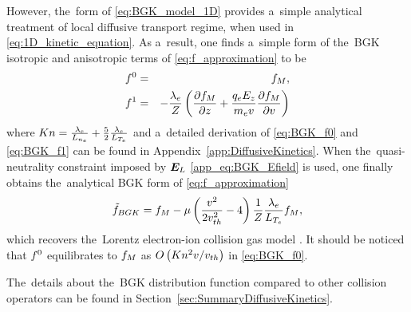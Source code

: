 However, the~form of \eqref{eq:BGK_model_1D} provides a~simple analytical 
treatment of local diffusive transport regime, when used in 
\eqref{eq:1D_kinetic_equation}. As a~result, one finds a~simple form of
the~BGK isotropic and anisotropic terms of \eqref{eq:f_approximation} to be
\begin{eqnarray}
  f^0 &=& f_M ,
  \label{eq:BGK_f0} \\
  f^1 &=& - \frac{\lambda_e}{Z}
  \left( \frac{\partial{f_M}}{\partial{z}} + \frac{q_eE_z}{m_ev}\frac{\partial{f_M}}{\partial{v}} \right)
  \label{eq:BGK_f1}
\end{eqnarray}
where 
$Kn = \frac{\lambda_e}{L_{n_e}} + \frac{5}{2}\frac{\lambda_e}{L_{T_e}}$
and a~detailed derivation of \eqref{eq:BGK_f0} and \eqref{eq:BGK_f1} 
can be found in Appendix~\ref{app:DiffusiveKinetics}.
When the~quasi-neutrality constraint imposed by $\boldsymbol{E}_L$
\eqref{app_eq:BGK_Efield} is used, one finally obtains the~analytical BGK form 
of \eqref{eq:f_approximation}
\begin{equation}
  \tilde{f}_{BGK} = f_M - \mu 
  \left( \frac{v^2}{2 v_{th}^2} - 4\right)\frac{1}{Z}
  \frac{\lambda_e}{L_{T_e}}f_M , 
  \label{eq:BGK_approximation}
\end{equation}
which recovers the~Lorentz electron-ion collision gas model 
\cite{Lorentz_1905}. It should be noticed that $f^0$ equilibrates to $f_M$ 
as $O\left( Kn^2 v/v_{th} \right)$ in \eqref{eq:BGK_f0}. 

The~details about the~BGK distribution function compared to other
collision operators can be found in Section~\ref{sec:SummaryDiffusiveKinetics}.


